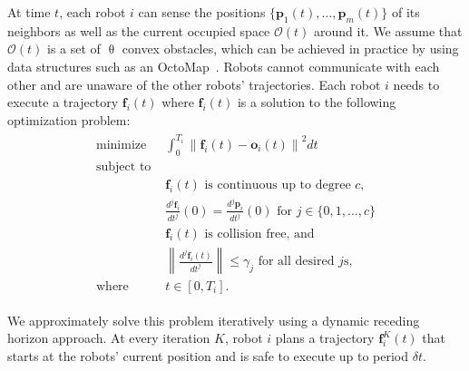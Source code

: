 \documentclass{svproc}
\newcommand{\vp}{\mathbf{p}}
\newcommand{\vf}{\mathbf{f}}
\newcommand{\vo}{\mathbf{o}}
\newcommand{\cO}{\mathcal{O}}
\newcommand{\todo}[1]{\textbf{\textcolor{red}{TODO: #1}}}
\begin{document}
At time $t$, each robot $i$ can sense the positions $\{\vp_1(t),\ldots,\vp_m(t)\}$ of its neighbors as well as the current occupied space $\cO(t)$ around it.
We assume that $\cO(t)$ is a set of $\uptheta$ convex obstacles, which can be achieved in practice by using data structures such as an OctoMap~\cite{octomap}.
Robots cannot communicate with each other and are unaware of the other robots' trajectories.
Each robot $i$ needs to execute a trajectory $\vf_i(t)$ where $\vf_i(t)$ is a solution to the following optimization problem:
\begin{align}
\begin{split}
    \text{minimize } & \int_{0}^{T_i}\left\|\vf_i(t)-\vo_i(t)\right\|^2 dt\\
    \text{subject to }& \\
    &\vf_i(t) \text{ is}\text{ continuous up to degree $c$},\\
    &\frac{d^j\vf_i}{dt^j}(0) = \frac{d^j\vp_i}{dt^j}(0)\text{ for } j\in\{0,1,...,c\}\\
    &\vf_i(t)\text{ is collision free, and}\\ 
    &\left\|\frac{d^j \vf_i(t)}{dt^j}\right\| \leq \gamma_j\text{ for all desired $j$s},\\
    \text{where } & t\in [0,T_i].
\end{split}
\label{eq:problem:opt}
\end{align}

We approximately solve this problem iteratively using a dynamic receding horizon approach.
At every iteration $K$, robot $i$ plans a trajectory $\vf^{K}_i(t)$ that starts at the robots' current position and is safe to execute up to period $\delta t$.

\end{document}
